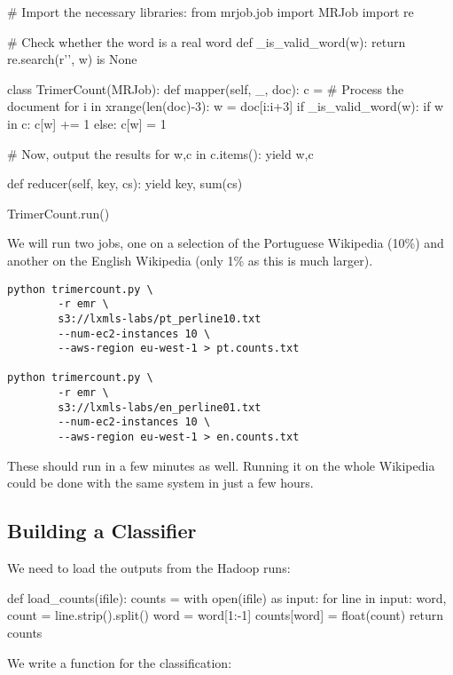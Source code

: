 \begin{python}
# Import the necessary libraries:
from mrjob.job import MRJob
import re

# Check whether the word is a real word
def _is_valid_word(w):
    return re.search(r'\W', w) is None

class TrimerCount(MRJob):
    def mapper(self, _, doc):
        c = {}
        # Process the document
        for i in xrange(len(doc)-3):
            w = doc[i:i+3]
            if _is_valid_word(w):
                if w in c:
                    c[w] += 1
                else:
                    c[w] = 1

        # Now, output the results
        for w,c in c.items():
            yield w,c

    def reducer(self, key, cs):
        yield key, sum(cs)

TrimerCount.run()
\end{python}

We will run two jobs, one on a selection of the Portuguese Wikipedia (10\%) and
another on the English Wikipedia (only 1\% as this is much larger).

\begin{verbatim}
python trimercount.py \
        -r emr \
        s3://lxmls-labs/pt_perline10.txt
        --num-ec2-instances 10 \
        --aws-region eu-west-1 > pt.counts.txt

python trimercount.py \
        -r emr \
        s3://lxmls-labs/en_perline01.txt
        --num-ec2-instances 10 \
        --aws-region eu-west-1 > en.counts.txt
\end{verbatim}

These should run in a few minutes as well. Running it on the whole Wikipedia
could be done with the same system in just a few hours.

\subsection{Building a Classifier}

We need to load the outputs from the Hadoop runs:

\begin{python}
def load_counts(ifile):
    counts = {}
    with open(ifile) as input:
        for line in input:
            word, count = line.strip().split()
            word = word[1:-1]
            counts[word] = float(count)
    return counts
\end{python}

We write a function for the classification:

